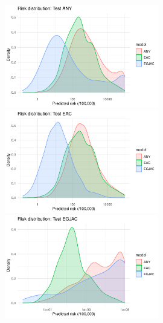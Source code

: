 \documentclass[12pt]{article}
\begin{document}
\clearpage
\begin{figure}[h]
\centering
\includegraphics[width=0.6\textwidth]{figures/risk_testANY.pdf}
\includegraphics[width=0.6\textwidth]{figures/risk_testEAC.pdf}
\includegraphics[width=0.6\textwidth]{figures/risk_testEGJAC.pdf}
\end{figure}
\end{document}
